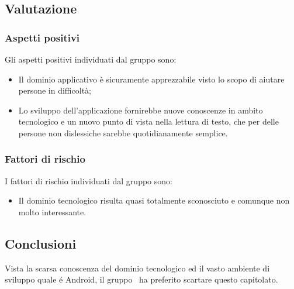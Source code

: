 \documentclass[../StudioDiFattibilita.tex]{subfiles}
\begin{document}
		\subsection{Valutazione}
			\subsubsection{Aspetti positivi}
				Gli aspetti positivi individuati dal gruppo sono:
					\begin{itemize}
						\item Il dominio applicativo è sicuramente apprezzabile visto lo scopo di aiutare persone
						in difficoltà;
						\item Lo sviluppo dell'applicazione fornirebbe nuove conoscenze in ambito tecnologico e
						un nuovo punto di vista nella lettura di testo, che per delle persone non dislessiche
						sarebbe quotidianamente semplice.
					\end{itemize}
			\subsubsection{Fattori di rischio}
				I fattori di rischio individuati dal gruppo sono:
				\begin{itemize}
					\item Il dominio tecnologico risulta quasi totalmente sconosciuto e comunque non molto
					interessante.
				\end{itemize}
			\subsection{Conclusioni}
				Vista la scarsa conoscenza del dominio tecnologico ed il vasto ambiente di sviluppo quale é
				Android, il gruppo \kaleidoscode\ ha preferito scartare questo capitolato.
\end{document}
